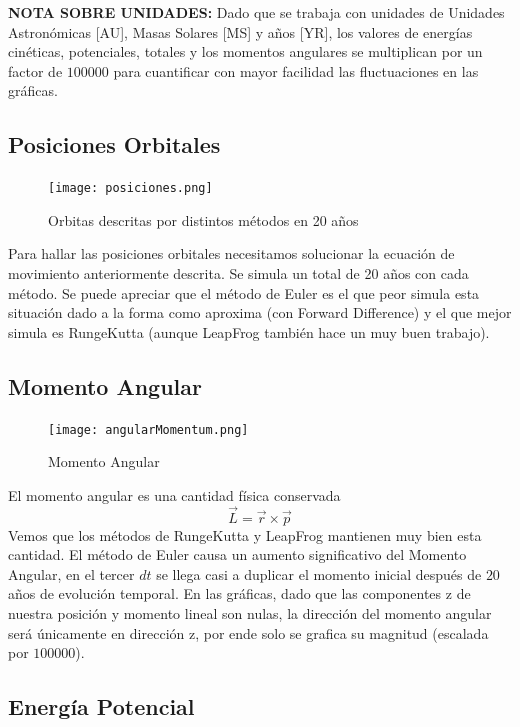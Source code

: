 \documentclass{article}
\begin{document}
\textbf{NOTA SOBRE UNIDADES: }Dado que se trabaja con unidades de Unidades Astron\'omicas [AU], Masas Solares [MS] y a\~nos [YR], los valores de energ\'ias cin\'eticas, potenciales, totales y los momentos angulares se  multiplican  por un factor de $100000$ para cuantificar con mayor facilidad las fluctuaciones en las gr\'aficas.
\subsection*{Posiciones Orbitales}

\begin{figure}[!htbp]
 \centering
  \texttt{[image: posiciones.png]}
  \caption{Orbitas descritas por distintos m\'etodos en 20 a\~nos }
\end{figure}
Para hallar las posiciones orbitales necesitamos solucionar la ecuaci\'on de movimiento anteriormente descrita. Se simula un total de 20 a\~nos con cada m\'etodo.
Se puede apreciar que el m\'etodo de Euler es el que peor simula esta situaci\'on dado a la forma como aproxima (con Forward Difference) y el que mejor simula es RungeKutta (aunque LeapFrog tambi\'en hace un muy buen trabajo).

\subsection*{Momento Angular}

\begin{figure}[!htbp]
 \centering
  \texttt{[image: angularMomentum.png]}
  \caption{Momento Angular}
\end{figure}

El momento angular es una cantidad f\'isica conservada
\begin{equation*}
    \Vec{L} = \Vec{r} \times \Vec{p}
\end{equation*}
Vemos que los m\'etodos de RungeKutta y LeapFrog mantienen muy bien esta cantidad. El m\'etodo de Euler causa un aumento significativo del Momento Angular, en el tercer $dt$ se llega casi a duplicar el momento inicial despu\'es de $20$ a\~nos de evoluci\'on temporal. En las gr\'aficas, dado que las componentes z de nuestra posici\'on y momento lineal son nulas, la direcci\'on del momento angular ser\'a \'unicamente en direcci\'on z, por ende solo se grafica su magnitud (escalada por $100000$). 

\subsection*{Energ\'ia Potencial}
\end{document}
